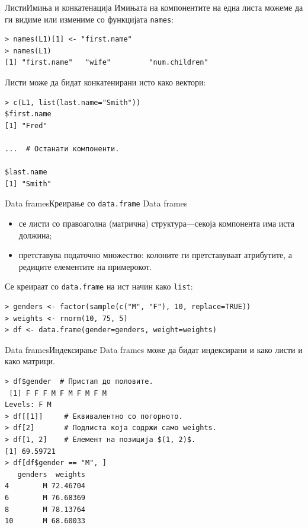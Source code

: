 \documentclass[hyperref={unicode}, xcolor={svgnames, table},
usepdftitle=false]{beamer}
\theoremstyle{remark}
\begin{document}
\begin{frame}[fragile]{Листи}{Имиња и конкатенација}
  Имињата на компонентите на една листа можеме да ги видиме или измениме со
  функцијата \texttt{names}:
\begin{verbatim}
> names(L1)[1] <- "first.name"
> names(L1)
[1] "first.name"   "wife"         "num.children"
\end{verbatim}

  Листи може да бидат конкатенирани исто како вектори:
\begin{verbatim}
> c(L1, list(last.name="Smith"))
$first.name
[1] "Fred"

...  # Останати компоненти.

$last.name
[1] "Smith"
\end{verbatim}
\end{frame}

\begin{frame}[fragile]{Data frames}{Креирање со \texttt{data.frame}}
  Data frames
  \begin{itemize}
  \item се листи со правоаголна (матрична) структура---секоја компонента има
    иста должина;
  \item претставува податочно множество: колоните ги претставуваат атрибутите, а
    редиците елементите на примерокот.
  \end{itemize}

  Се креираат со \texttt{data.frame} на ист начин како \texttt{list}:
\begin{verbatim}
> genders <- factor(sample(c("M", "F"), 10, replace=TRUE))
> weights <- rnorm(10, 75, 5)
> df <- data.frame(gender=genders, weight=weights)
\end{verbatim}
\end{frame}

\begin{frame}[fragile]{Data frames}{Индексирање}
  Data frames може да бидат индексирани и како листи и како матрици.
\begin{verbatim}
> df$gender  # Пристап до половите.
 [1] F F F M F M F M F M
Levels: F M
> df[[1]]     # Еквивалентно со погорното.
> df[2]       # Подлиста која содржи само weights.
> df[1, 2]    # Елемент на позиција $(1, 2)$.
[1] 69.59721
> df[df$gender == "M", ]
   genders  weights
4        M 72.46704
6        M 76.68369
8        M 78.13764
10       M 68.60033
\end{verbatim}
\end{frame}
\end{document}
